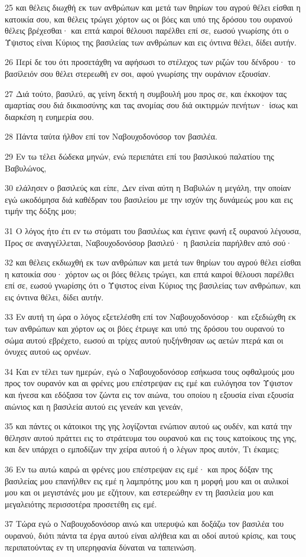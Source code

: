 \par 25 και θέλεις διωχθή εκ των ανθρώπων και μετά των θηρίων του αγρού θέλει είσθαι η κατοικία σου, και θέλεις τρώγει χόρτον ως οι βόες και υπό της δρόσου του ουρανού θέλεις βρέχεσθαι· και επτά καιροί θέλουσι παρέλθει επί σε, εωσού γνωρίσης ότι ο Ύψιστος είναι Κύριος της βασιλείας των ανθρώπων και εις όντινα θέλει, δίδει αυτήν.
\par 26 Περί δε του ότι προσετάχθη να αφήσωσι το στέλεχος των ριζών του δένδρου· το βασίλειόν σου θέλει στερεωθή εν σοι, αφού γνωρίσης την ουράνιον εξουσίαν.
\par 27 Διά τούτο, βασιλεύ, ας γείνη δεκτή η συμβουλή μου προς σε, και έκκοψον τας αμαρτίας σου διά δικαιοσύνης και τας ανομίας σου διά οικτιρμών πενήτων· ίσως και διαρκέση η ευημερία σου.
\par 28 Πάντα ταύτα ήλθον επί τον Ναβουχοδονόσορ τον βασιλέα.
\par 29 Εν τω τέλει δώδεκα μηνών, ενώ περιεπάτει επί του βασιλικού παλατίου της Βαβυλώνος,
\par 30 ελάλησεν ο βασιλεύς και είπε, Δεν είναι αύτη η Βαβυλών η μεγάλη, την οποίαν εγώ ωκοδόμησα διά καθέδραν του βασιλείου με την ισχύν της δυνάμεώς μου και εις τιμήν της δόξης μου;
\par 31 Ο λόγος ήτο έτι εν τω στόματι του βασιλέως και έγεινε φωνή εξ ουρανού λέγουσα, Προς σε αναγγέλλεται, Ναβουχοδονόσορ βασιλεύ· η βασιλεία παρήλθεν από σού·
\par 32 και θέλεις εκδιωχθή εκ των ανθρώπων και μετά των θηρίων του αγρού θέλει είσθαι η κατοικία σου· χόρτον ως οι βόες θέλεις τρώγει, και επτά καιροί θέλουσι παρέλθει επί σε, εωσού γνωρίσης ότι ο Ύψιστος είναι Κύριος της βασιλείας των ανθρώπων, και εις όντινα θέλει, δίδει αυτήν.
\par 33 Εν αυτή τη ώρα ο λόγος εξετελέσθη επί τον Ναβουχοδονόσορ· και εξεδιώχθη εκ των ανθρώπων και χόρτον ως οι βόες έτρωγε και υπό της δρόσου του ουρανού το σώμα αυτού εβρέχετο, εωσού αι τρίχες αυτού ηυξήνθησαν ως αετών πτερά και οι όνυχες αυτού ως ορνέων.
\par 34 Και εν τέλει των ημερών, εγώ ο Ναβουχοδονόσορ εσήκωσα τους οφθαλμούς μου προς τον ουρανόν και αι φρένες μου επέστρεψαν εις εμέ και ευλόγησα τον Ύψιστον και ήνεσα και εδόξασα τον ζώντα εις τον αιώνα, του οποίου η εξουσία είναι εξουσία αιώνιος και η βασιλεία αυτού εις γενεάν και γενεάν,
\par 35 και πάντες οι κάτοικοι της γης λογίζονται ενώπιον αυτού ως ουδέν, και κατά την θέλησιν αυτού πράττει εις το στράτευμα του ουρανού και εις τους κατοίκους της γης, και δεν υπάρχει ο εμποδίζων την χείρα αυτού ή ο λέγων προς αυτόν, Τι έκαμες;
\par 36 Εν τω αυτώ καιρώ αι φρένες μου επέστρεψαν εις εμέ· και προς δόξαν της βασιλείας μου επανήλθεν εις εμέ η λαμπρότης μου και η μορφή μου και οι αυλικοί μου και οι μεγιστάνές μου με εζήτουν, και εστερεώθην εν τη βασιλεία μου και μεγαλειότης περισσοτέρα προσετέθη εις εμέ.
\par 37 Τώρα εγώ ο Ναβουχοδονόσορ αινώ και υπερυψώ και δοξάζω τον βασιλέα του ουρανού, διότι πάντα τα έργα αυτού είναι αλήθεια και αι οδοί αυτού κρίσις, και τους περιπατούντας εν τη υπερηφανία δύναται να ταπεινώση.

